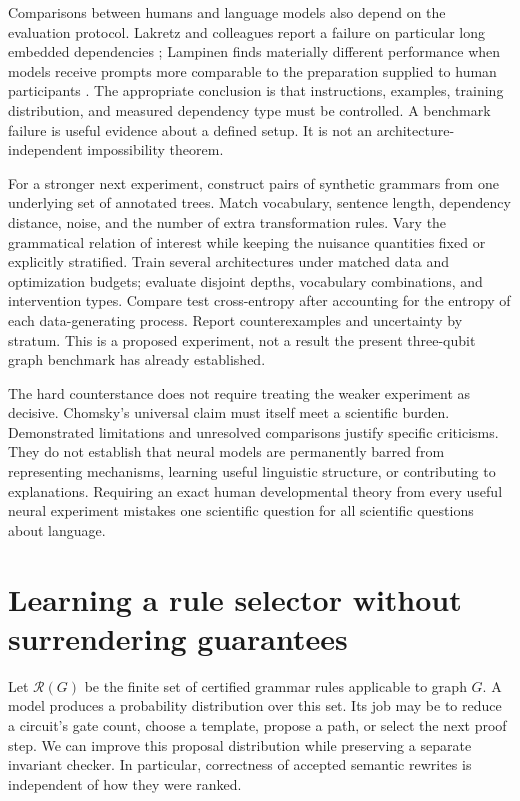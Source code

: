 Comparisons between humans and language models also depend on the evaluation protocol. Lakretz and colleagues report a failure on particular long embedded dependencies \cite{LLnested}; Lampinen finds materially different performance when models receive prompts more comparable to the preparation supplied to human participants \cite{LLlampinen}. The appropriate conclusion is that instructions, examples, training distribution, and measured dependency type must be controlled. A benchmark failure is useful evidence about a defined setup. It is not an architecture-independent impossibility theorem.

For a stronger next experiment, construct pairs of synthetic grammars from one underlying set of annotated trees. Match vocabulary, sentence length, dependency distance, noise, and the number of extra transformation rules. Vary the grammatical relation of interest while keeping the nuisance quantities fixed or explicitly stratified. Train several architectures under matched data and optimization budgets; evaluate disjoint depths, vocabulary combinations, and intervention types. Compare test cross-entropy after accounting for the entropy of each data-generating process. Report counterexamples and uncertainty by stratum. This is a proposed experiment, not a result the present three-qubit graph benchmark has already established.

The hard counterstance does not require treating the weaker experiment as decisive. Chomsky's universal claim must itself meet a scientific burden. Demonstrated limitations and unresolved comparisons justify specific criticisms. They do not establish that neural models are permanently barred from representing mechanisms, learning useful linguistic structure, or contributing to explanations. Requiring an exact human developmental theory from every useful neural experiment mistakes one scientific question for all scientific questions about language.

\section{Learning a rule selector without surrendering guarantees}

Let $\mathcal R(G)$ be the finite set of certified grammar rules applicable to graph $G$. A model produces a probability distribution over this set. Its job may be to reduce a circuit's gate count, choose a template, propose a path, or select the next proof step. We can improve this proposal distribution while preserving a separate invariant checker. In particular, correctness of accepted semantic rewrites is independent of how they were ranked.


